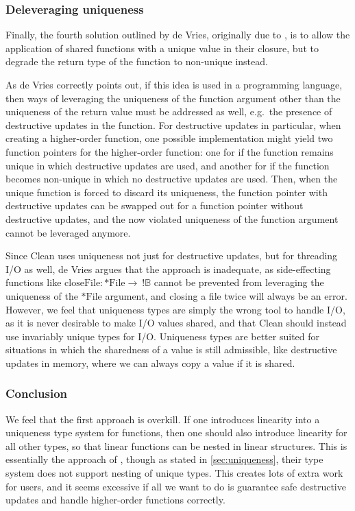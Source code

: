 \subsubsection{Deleveraging uniqueness}
Finally, the fourth solution outlined by de Vries, originally due to \cite{harrington_uniqueness_2006}, is to allow the application of shared functions with a unique value in their closure, but to degrade the return type of the function to non-unique instead. 

As de Vries correctly points out, if this idea is used in a programming language, then ways of leveraging the uniqueness of the function argument other than the uniqueness of the return value must be addressed as well, e.g.\ the presence of destructive updates in the function. For destructive updates in particular, when creating a higher-order function, one possible implementation might yield two function pointers for the higher-order function: one for if the function remains unique in which destructive updates are used, and another for if the function becomes non-unique in which no destructive updates are used. Then, when the unique function is forced to discard its uniqueness, the function pointer with destructive updates can be swapped out for a function pointer without destructive updates, and the now violated uniqueness of the function argument cannot be leveraged anymore.

Since Clean uses uniqueness not just for destructive updates, but for threading I/O as well, de Vries argues that the approach is inadequate, as side-effecting functions like $\mathrm{closeFile} : *\mathrm{File} \to\ !\mathbb{B}$ cannot be prevented from leveraging the uniqueness of the $*\mathrm{File}$ argument, and closing a file twice will always be an error. However, we feel that uniqueness types are simply the wrong tool to handle I/O, as it is never desirable to make I/O values shared, and that Clean should instead use invariably unique types for I/O. Uniqueness types are better suited for situations in which the sharedness of a value is still admissible, like destructive updates in memory, where we can always copy a value if it is shared.

\subsubsection{Conclusion}
We feel that the first approach is overkill. If one introduces linearity into a uniqueness type system for functions, then one should also introduce linearity for all other types, so that linear functions can be nested in linear structures. This is essentially the approach of \cite{sergey_linearity_2022}, though as stated in \cref{sec:uniqueness}, their type system does not support nesting of unique types. This creates lots of extra work for users, and it seems excessive if all we want to do is guarantee safe destructive updates and handle higher-order functions correctly.

